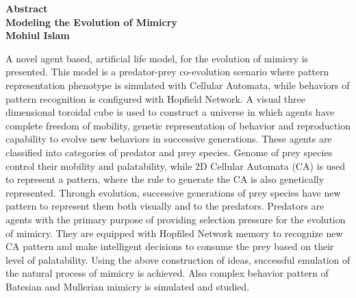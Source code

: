 \newpage
\begin{center}

\Large \textbf{Abstract}\\[0.5cm]
\large \textbf{Modeling the Evolution of Mimicry}\\
\small \textbf{Mohiul Islam}\\

\end{center}

A novel agent based, artificial life model, for the evolution of mimicry is presented. This model is a predator-prey co-evolution scenario where pattern representation phenotype is simulated with Cellular Automata, while behaviors of pattern recognition is configured with Hopfield Network. A visual three dimensional toroidal cube is used to construct a universe in which agents have complete freedom of mobility, genetic representation of behavior and reproduction capability to evolve new behaviors in successive generations. These agents are classified into categories of predator and prey species. Genome of prey species control their mobility and palatability, while 2D Cellular Automata (CA) is used to represent a pattern, where the rule to generate the CA is also genetically represented. Through evolution, successive generations of prey species have new pattern to represent them both visually and to the predators. Predators are agents with the primary purpose of providing selection pressure for the evolution of mimicry. They are equipped with Hopfiled Network memory to recognize new CA pattern and make intelligent decisions to consume the prey based on their level of palatability. Using the above construction of ideas, successful emulation of the natural process of mimicry is achieved. Also complex behavior pattern of Batesian and Mullerian mimicry is simulated and studied.

\setcounter{page}{3}
